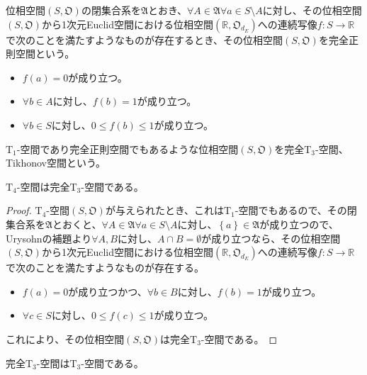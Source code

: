 \documentclass[dvipdfmx]{jsarticle}
\begin{document}
\begin{dfn}
位相空間$\left( S,\mathfrak{O} \right)$の閉集合系を$\mathfrak{A}$とおき、$\forall A \in \mathfrak{A\forall}a \in S \setminus A$に対し、その位相空間$\left( S,\mathfrak{O} \right)$から1次元Euclid空間における位相空間$\left( \mathbb{R},\mathfrak{O}_{d_{E}} \right)$への連続写像$f:S \rightarrow \mathbb{R}$で次のことを満たすようなものが存在するとき、その位相空間$\left( S,\mathfrak{O} \right)$を完全正則空間という。
\begin{itemize}
\item
  $f(a) = 0$が成り立つ。
\item
  $\forall b \in A$に対し、$f(b) = 1$が成り立つ。
\item
  $\forall b \in S$に対し、$0 \leq f(b) \leq 1$が成り立つ。
\end{itemize}
\end{dfn}
\begin{dfn}
$\mathrm{T}_{1}$-空間であり完全正則空間でもあるような位相空間$\left( S,\mathfrak{O} \right)$を完全$\mathrm{T}_{3}$-空間、Tikhonov空間という。
\end{dfn}
\begin{thm}\label{8.1.7.23} $\mathrm{T}_{4}$-空間は完全$\mathrm{T}_{3}$-空間である。
\end{thm}
\begin{proof}
$\mathrm{T}_{4}$-空間$\left( S,\mathfrak{O} \right)$が与えられたとき、これは$\mathrm{T}_{1}$-空間でもあるので、その閉集合系を$\mathfrak{A}$とおくと、$\forall A \in \mathfrak{A\forall}a \in S \setminus A$に対し、$\left\{ a \right\}\in \mathfrak{A}$が成り立つので、Urysohnの補題より$\forall A,B$に対し、$A \cap B = \emptyset$が成り立つなら、その位相空間$\left( S,\mathfrak{O} \right)$から1次元Euclid空間における位相空間$\left( \mathbb{R},\mathfrak{O}_{d_{E}} \right)$への連続写像$f:S \rightarrow \mathbb{R}$で次のことを満たすようなものが存在する。
\begin{itemize}
\item
  $f(a) = 0$が成り立つかつ、$\forall b \in B$に対し、$f(b) = 1$が成り立つ。
\item
  $\forall c \in S$に対し、$0 \leq f(c) \leq 1$が成り立つ。
\end{itemize}
これにより、その位相空間$\left( S,\mathfrak{O} \right)$は完全$\mathrm{T}_{3}$-空間である。
\end{proof}
\begin{thm}\label{8.1.7.24} 完全$\mathrm{T}_{3}$-空間は$\mathrm{T}_{3}$-空間である。
\end{thm}
\end{document}
